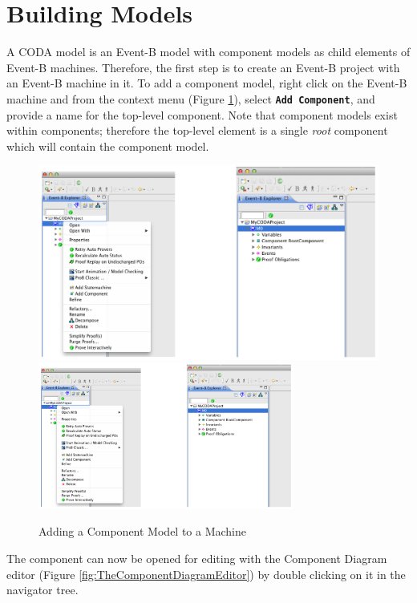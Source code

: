 \section{Building Models}
\label{sec:component_diagrams-buildingModels}

A CODA model is an Event-B model with component models as child elements of Event-B machines. Therefore, the first step is to create an Event-B project with an Event-B machine in it. To add a component model, right click on the Event-B machine and from the context menu (Figure \ref{fig:AddingaComponentModeltoaMachine}), select \textbf{\texttt{Add Component}}, and provide a name for the top-level component. Note that component models exist within components; therefore the top-level element is a single \emph{root} component which will contain the component model.
 

\begin{figure}[!htbp]
  \centering
  \ifplastex
  \includegraphics[width=768]{figures/image4.png}
  \else
  \includegraphics[width=0.75\textwidth]{figures/image4.png}
  \fi
  \caption{Adding a Component Model to a Machine}
  \label{fig:AddingaComponentModeltoaMachine}
\end{figure}


The component can now be opened for editing with the Component Diagram editor (Figure \ref{fig:TheComponentDiagramEditor}) by double clicking on it in the navigator tree.
 
